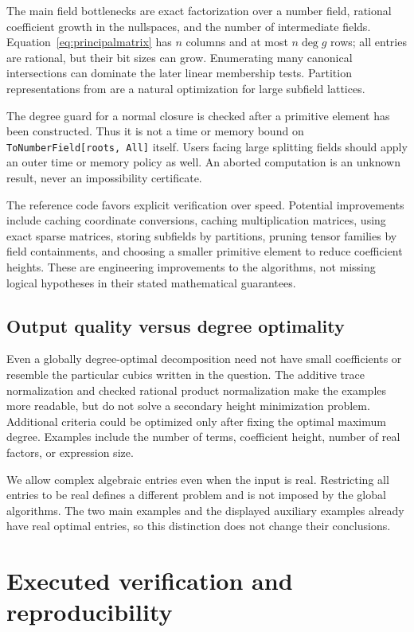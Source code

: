 \documentclass[11pt,letterpaper]{article}
\theoremstyle{definition}
\theoremstyle{remark}
\newcommand{\wl}[1]{\texttt{#1}}
\begin{document}
The main field bottlenecks are exact factorization over a number field,
rational coefficient growth in the nullspaces, and the number of
intermediate fields. Equation~\eqref{eq:principalmatrix} has \(n\) columns
and at most \(n\deg g\) rows; all entries are rational, but their bit sizes
can grow. Enumerating many canonical intersections can dominate the later
linear membership tests. Partition representations from \cite{szutkoski}
are a natural optimization for large subfield lattices.

The degree guard for a normal closure is checked after a primitive element
has been constructed. Thus it is not a time or memory bound on
\wl{ToNumberField[roots, All]} itself. Users facing large splitting fields
should apply an outer time or memory policy as well. An aborted computation
is an unknown result, never an impossibility certificate.

The reference code favors explicit verification over speed. Potential
improvements include caching coordinate conversions, caching multiplication
matrices, using exact sparse matrices, storing subfields by partitions,
pruning tensor families by field containments, and choosing a smaller
primitive element to reduce coefficient heights. These are engineering
improvements to the algorithms, not missing logical hypotheses in their
stated mathematical guarantees.

\subsection{Output quality versus degree optimality}
Even a globally degree-optimal decomposition need not have small
coefficients or resemble the particular cubics written in the question.
The additive trace normalization and checked rational product normalization
make the examples more readable, but do not solve a secondary height
minimization problem. Additional criteria could be optimized only after
fixing the optimal maximum degree. Examples include the number of terms,
coefficient height, number of real factors, or expression size.

We allow complex algebraic entries even when the input is real. Restricting
all entries to be real defines a different problem and is not imposed by
the global algorithms. The two main examples and the displayed auxiliary
examples already have real optimal entries, so this distinction does not
change their conclusions.

\section{Executed verification and reproducibility}\label{sec:verification}
\end{document}
